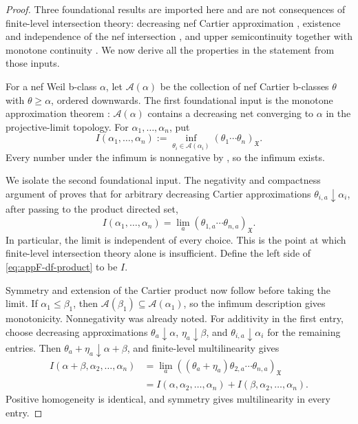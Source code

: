 \begin{proof}
Three foundational results are imported here and are not consequences of
finite-level intersection theory: decreasing nef Cartier approximation
\cite[Theorem~2.1]{DF20}, existence and independence of the nef intersection
\cite[Proposition--Definition~3.1]{DF20}, and upper semicontinuity together
with monotone continuity \cite[Theorem~3.2]{DF20}.  We now derive all the
properties in the statement from those inputs.

For a nef Weil b-class \(\alpha\), let \(\mathcal A(\alpha)\) be the
collection of nef Cartier b-classes \(\theta\) with
\(\theta\geq\alpha\), ordered downwards.  The first foundational input is
the monotone approximation theorem
\cite[Theorem~2.1]{DF20}: \(\mathcal A(\alpha)\) contains a decreasing
net converging to \(\alpha\) in the projective-limit topology.  For
\(\alpha_1,\ldots,\alpha_n\), put
\[
 I(\alpha_1,\ldots,\alpha_n)
 :=
 \inf_{\theta_i\in\mathcal A(\alpha_i)}
       (\theta_1\cdots\theta_n)_{\mathfrak X}.
\]
Every number under the infimum is nonnegative by
, so the infimum exists.

We isolate the second foundational input.  The negativity and compactness
argument of \cite[Proposition--Definition~3.1]{DF20} proves that for
arbitrary decreasing Cartier approximations
\(\theta_{i,a}\downarrow\alpha_i\), after passing to the product directed
set,
\[
 I(\alpha_1,\ldots,\alpha_n)
       =\lim_a(\theta_{1,a}\cdots\theta_{n,a})_{\mathfrak X}.
\]
In particular, the limit is independent of every choice.  This is the
point at which finite-level intersection theory alone is insufficient.
Define the left side of \eqref{eq:appF-df-product} to be \(I\).

Symmetry and extension of the Cartier product now follow before taking the
limit.  If \(\alpha_1\leq\beta_1\), then
\(\mathcal A(\beta_1)\subseteq\mathcal A(\alpha_1)\), so the infimum
description gives monotonicity.  Nonnegativity was already noted.
For additivity in the first entry, choose decreasing approximations
\(\theta_a\downarrow\alpha\), \(\eta_a\downarrow\beta\), and
\(\theta_{i,a}\downarrow\alpha_i\) for the remaining entries.  Then
\(\theta_a+\eta_a\downarrow\alpha+\beta\), and finite-level
multilinearity gives
\[
\begin{aligned}
 I(\alpha+\beta,\alpha_2,\ldots,\alpha_n)
 &=\lim_a
   ((\theta_a+\eta_a)\theta_{2,a}\cdots\theta_{n,a})_{\mathfrak X}\\
 &=I(\alpha,\alpha_2,\ldots,\alpha_n)
   +I(\beta,\alpha_2,\ldots,\alpha_n).
\end{aligned}
\]
Positive homogeneity is identical, and symmetry gives multilinearity in
every entry.


\end{proof}
